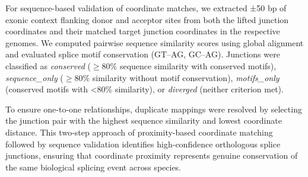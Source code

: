 For sequence-based validation of coordinate matches, we extracted ±50 bp of exonic context flanking donor and acceptor sites from both the lifted junction coordinates and their matched target junction coordinates in the respective genomes. We computed pairwise sequence similarity scores using global alignment and evaluated splice motif conservation (GT–AG, GC–AG). Junctions were classified as \textit{conserved} ($\geq$80\% sequence similarity with conserved motifs), \textit{sequence\_only} ($\geq$80\% similarity without motif conservation), \textit{motifs\_only} (conserved motifs with <80\% similarity), or \textit{diverged} (neither criterion met).

To ensure one-to-one relationships, duplicate mappings were resolved by selecting the junction pair with the highest sequence similarity and lowest coordinate distance. This two-step approach of proximity-based coordinate matching followed by sequence validation identifies high-confidence orthologous splice junctions, ensuring that coordinate proximity represents genuine conservation of the same biological splicing event across species.
